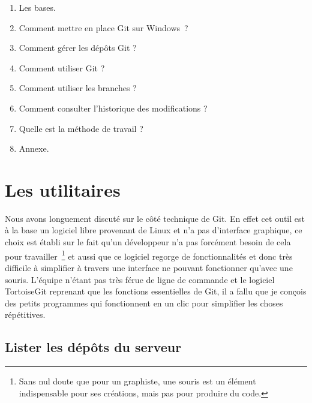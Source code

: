 \begin{enumerate}
    \item Les bases.
    \item Comment mettre en place Git sur Windows~\textregistered ?
    \item Comment gérer les dépôts Git ?
    \item Comment utiliser Git ?
    \item Comment utiliser les branches ?
    \item Comment consulter l'historique des modifications ?
    \item Quelle est la méthode de travail ?
    \item Annexe.
\end{enumerate}

\section{Les utilitaires} %
\label{sec:Les utilitaires}

Nous avons longuement discuté sur le côté technique de Git. En effet cet
outil est à la base un logiciel libre provenant de Linux et n'a pas
d'interface graphique, ce choix est établi sur le fait qu'un développeur
n'a pas forcément besoin de cela pour travailler\, \footnote{Sans nul
doute que pour un graphiste, une souris est un élément indispensable
pour ses créations, mais pas pour produire du code.} et aussi que ce
logiciel regorge de fonctionnalités et donc très difficile à simplifier
à travers une interface ne pouvant fonctionner qu'avec une souris.
L'équipe n'étant pas très férue de ligne de commande et le logiciel
TortoiseGit reprenant que les fonctions essentielles de Git, il a fallu
que je conçois des petits programmes qui fonctionnent en un clic pour
simplifier les choses répétitives.

    \subsection{Lister les dépôts du serveur} %
    \label{sub:Lister les dépôts du serveur}

